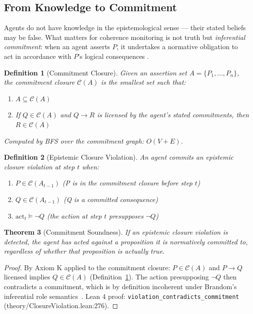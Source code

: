 \documentclass[11pt]{article}
\newtheorem{theorem}{Theorem}[section]
\newtheorem{definition}[theorem]{Definition}
\newcommand{\C}{\mathcal{C}}      %
\begin{document}
\subsection{From Knowledge to Commitment}
\label{sec:commitments}

Agents do not have knowledge in the epistemological sense — their stated
beliefs may be false. What matters for coherence monitoring is not truth
but \emph{inferential commitment}: when an agent asserts $P$, it undertakes
a normative obligation to act in accordance with $P$'s logical consequences
\citep{brandom1994}.

\begin{definition}[Commitment Closure]
  \label{def:closure}
  Given an assertion set $A = \{P_1, \ldots, P_n\}$, the commitment closure
  $\C(A)$ is the smallest set such that:
  \begin{enumerate}
    \item $A \subseteq \C(A)$
    \item If $Q \in \C(A)$ and $Q \to R$ is licensed by the agent's stated
      commitments, then $R \in \C(A)$
  \end{enumerate}
  Computed by BFS over the commitment graph: $O(V + E)$.
\end{definition}

\begin{definition}[Epistemic Closure Violation]
  \label{def:violation}
  An agent commits an epistemic closure violation at step $t$ when:
  \begin{enumerate}
    \item $P \in \C(A_{t-1})$ (P is in the commitment closure before step $t$)
    \item $Q \in \C(A_{t-1})$ (Q is a committed consequence)
    \item $\text{act}_t \models \neg Q$ (the action at step $t$ presupposes $\neg Q$)
  \end{enumerate}
\end{definition}

\begin{theorem}[Commitment Soundness]
  \label{thm:soundness}
  If an epistemic closure violation is detected, the agent has acted against
  a proposition it is normatively committed to, regardless of whether that
  proposition is actually true.
\end{theorem}
\begin{proof}
  By Axiom K applied to the commitment closure: $P \in \C(A)$ and
  $P \to Q$ licensed implies $Q \in \C(A)$ (Definition~\ref{def:closure}).
  The action presupposing $\neg Q$ then contradicts a commitment, which is
  by definition incoherent under Brandom's inferential role
  semantics~\citep{brandom1994}. Lean 4 proof:
  \texttt{violation\_contradicts\_commitment} (theory/ClosureViolation.lean:276).
\end{proof}
\end{document}
